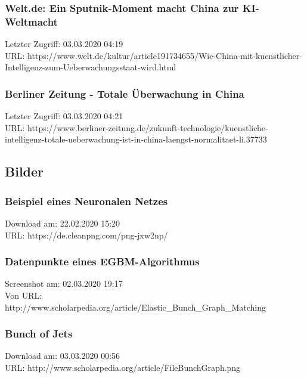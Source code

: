 	\subsubsection{Welt.de: Ein Sputnik-Moment macht China zur KI-Weltmacht}
	\label{welt:China_ki_weltmacht}
		Letzter Zugriff: 03.03.2020 04:19\\
		URL: https://www.welt.de/kultur/article191734655/Wie-China-mit-kuenstlicher-Intelligenz-zum-Ueberwachungsstaat-wird.html

	\subsubsection{Berliner Zeitung - Totale Überwachung in China}
	\label{berlinerZeitung:totale_ueberwachung_in_china}
		Letzter Zugriff: 03.03.2020 04:21\\
		URL: https://www.berliner-zeitung.de/zukunft-technologie/kuenstliche-intelligenz-totale-ueberwachung-ist-in-china-laengst-normalitaet-li.37733

\subsection{Bilder}
\label{subsec:Bilder_Anhang}
	\subsubsection{Beispiel eines Neuronalen Netzes}
	\label{subsubsec:Beispiel_eines_Neuronalen_Netzes}
	Download am: 22.02.2020 15:20\\
	URL: https://de.cleanpng.com/png-jxw2np/

	\subsubsection{Datenpunkte eines EGBM-Algorithmus}
	\label{image:datapoints_of_a_EGBM_algoryhtm}
	Screenshot am: 02.03.2020 19:17\\
	Von URL: http://www.scholarpedia.org/article/Elastic\_Bunch\_Graph\_Matching

	\subsubsection{Bunch of Jets}
	\label{image:Bunch_of_jets}
		Download am: 03.03.2020 00:56\\
		URL: http://www.scholarpedia.org/article/File\:BunchGraph.png